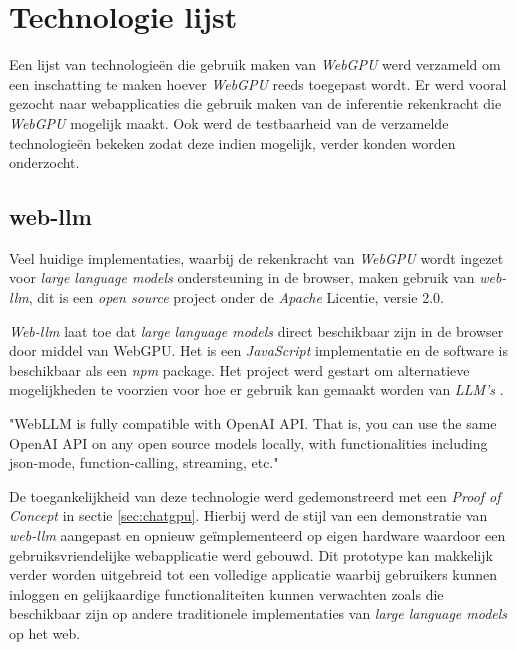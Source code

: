 \chapter{Technologie lijst}
\label{ch:technologylist}

Een lijst van technologieën die gebruik maken van \textit{WebGPU} werd verzameld om een inschatting te maken hoever \textit{WebGPU} reeds toegepast wordt. Er werd vooral gezocht naar webapplicaties die gebruik maken van de inferentie rekenkracht die \textit{WebGPU} mogelijk maakt. Ook werd de testbaarheid van de verzamelde technologieën bekeken zodat deze indien mogelijk, verder konden worden onderzocht.

\section{web-llm}

Veel huidige implementaties, waarbij de rekenkracht van \textit{WebGPU} wordt ingezet voor \textit{large language models} ondersteuning in de browser, maken gebruik van \textit{web-llm}, dit is een \textit{open source} project onder de \textit{Apache} Licentie, versie 2.0.

\bigbreak{}

\textit{Web-llm} laat toe dat \textit{large language models} direct beschikbaar zijn in de browser door middel van WebGPU. Het is een \textit{JavaScript} implementatie en de software is beschikbaar als een \textit{npm} package. Het project werd gestart om alternatieve mogelijkheden te voorzien voor hoe er gebruik kan gemaakt worden van \textit{LLM's} \autocite{mlcai2024}.

\begin{displayquote}
    "WebLLM is fully compatible with OpenAI API. That is, you can use the same OpenAI API on any open source models locally, with functionalities including json-mode, function-calling, streaming, etc."
\end{displayquote}

De toegankelijkheid van deze technologie werd gedemonstreerd met een \textit{Proof of Concept} in sectie \ref{sec:chatgpu}. Hierbij werd de stijl van een demonstratie van \textit{web-llm} aangepast en opnieuw geïmplementeerd op eigen hardware waardoor een ge\-bruiks\-vrien\-de\-lij\-ke webapplicatie werd gebouwd. Dit prototype kan makkelijk verder worden uitgebreid tot een volledige applicatie waarbij gebruikers kunnen inloggen en gelijkaardige functionaliteiten kunnen verwachten zoals die beschikbaar zijn op andere traditionele implementaties van \textit{large language models} op het web.

